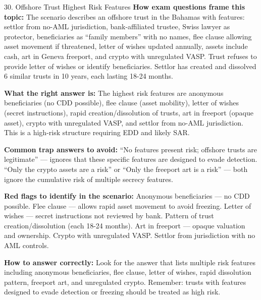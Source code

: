 \documentclass[11pt,a4paper]{beamer}
\begin{document}
	\begin{frame}{30. Offshore Trust Highest Risk Features}
		\tiny
		\noindent\textbf{How exam questions frame this topic:} The scenario describes an offshore trust in the Bahamas with features: settlor from no-AML jurisdiction, bank-affiliated trustee, Swiss lawyer as protector, beneficiaries as “family members” with no names, flee clause allowing asset movement if threatened, letter of wishes updated annually, assets include cash, art in Geneva freeport, and crypto with unregulated VASP. Trust refuses to provide letter of wishes or identify beneficiaries. Settlor has created and dissolved 6 similar trusts in 10 years, each lasting 18-24 months.
		
		\vspace{0.1cm}
		\noindent\textbf{What the right answer is:} The highest risk features are anonymous beneficiaries (no CDD possible), flee clause (asset mobility), letter of wishes (secret instructions), rapid creation/dissolution of trusts, art in freeport (opaque asset), crypto with unregulated VASP, and settlor from no-AML jurisdiction. This is a high-risk structure requiring EDD and likely SAR.
		
		\vspace{0.1cm}
		\noindent\textbf{Common trap answers to avoid:} “No features present risk; offshore trusts are legitimate” — ignores that these specific features are designed to evade detection. “Only the crypto assets are a risk” or “Only the freeport art is a risk” — both ignore the cumulative risk of multiple secrecy features.
		
		\vspace{0.1cm}
		\noindent\textbf{Red flags to identify in the scenario:} Anonymous beneficiaries — no CDD possible. Flee clause — allows rapid asset movement to avoid freezing. Letter of wishes — secret instructions not reviewed by bank. Pattern of trust creation/dissolution (each 18-24 months). Art in freeport — opaque valuation and ownership. Crypto with unregulated VASP. Settlor from jurisdiction with no AML controls.
		
		\vspace{0.1cm}
		\noindent\textbf{How to answer correctly:} Look for the answer that lists multiple risk features including anonymous beneficiaries, flee clause, letter of wishes, rapid dissolution pattern, freeport art, and unregulated crypto. Remember: trusts with features designed to evade detection or freezing should be treated as high risk.
	\end{frame}
	
\end{document}
